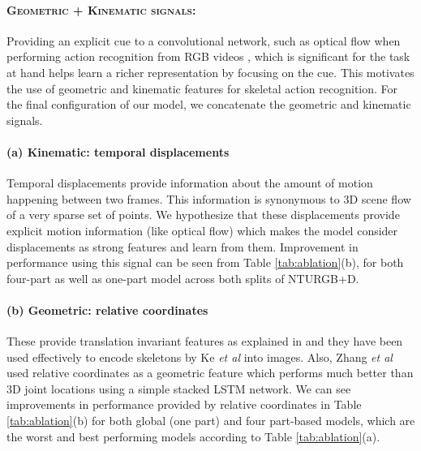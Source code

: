 \documentclass{bmvc2k}
\def\etal{\emph{et al}\bmvaOneDot}
\begin{document}
\paragraph{\textsc{Geometric + Kinematic signals}:} Providing an explicit cue to a convolutional network, such as optical flow when performing action recognition from RGB videos \cite{NIPS2014_5353}, which is significant for the task at hand helps learn a richer representation by focusing on the cue. This motivates the use of geometric and kinematic features for skeletal action recognition. For the final configuration of our model, we concatenate the geometric and kinematic signals.

\paragraph{(a) Kinematic: temporal displacements} Temporal displacements provide information about the amount of motion happening between two frames. This information is synonymous to 3D scene flow of a very sparse set of points. We hypothesize that these displacements provide explicit motion information (like optical flow) which makes the model consider displacements as strong features and learn from them. Improvement in performance using this signal can be seen from Table \ref{tab:ablation}(b), for both four-part as well as one-part model across both splits of NTURGB+D.

\paragraph{(b) Geometric: relative coordinates} These provide translation invariant features as explained in \cite{verma2018feastnet} and they have been used effectively to encode skeletons by Ke \etal \cite{ke2017new} into images. Also, Zhang \etal \cite{zhang2017geometric} used relative coordinates as a geometric feature which performs much better than 3D joint locations using a simple stacked LSTM network. We can see improvements in performance provided by relative coordinates in Table \ref{tab:ablation}(b) for both global (one part) and four part-based models, which are the worst and best performing models according to Table \ref{tab:ablation}(a).
\end{document}
